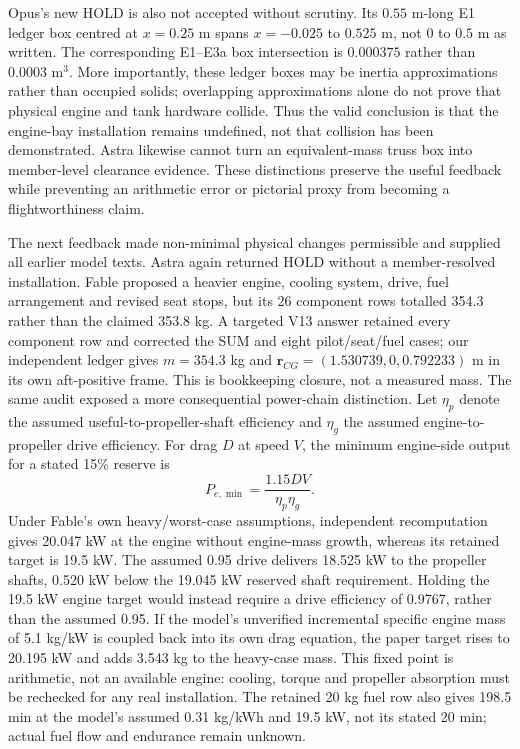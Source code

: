 \documentclass[10pt,letterpaper]{article}
\begin{document}
Opus's new HOLD is also not accepted without scrutiny. Its $0.55$ m-long E1 ledger box centred at $x=0.25$ m spans $x=-0.025$ to $0.525$ m, not $0$ to $0.5$ m as written. The corresponding E1--E3a box intersection is $0.000375$ rather than $0.0003$ m$^3$. More importantly, these ledger boxes may be inertia approximations rather than occupied solids; overlapping approximations alone do not prove that physical engine and tank hardware collide. Thus the valid conclusion is that the engine-bay installation remains undefined, not that collision has been demonstrated. Astra likewise cannot turn an equivalent-mass truss box into member-level clearance evidence. These distinctions preserve the useful feedback while preventing an arithmetic error or pictorial proxy from becoming a flightworthiness claim.

The next feedback made non-minimal physical changes permissible and supplied all earlier model texts. Astra again returned HOLD without a member-resolved installation. Fable proposed a heavier engine, cooling system, drive, fuel arrangement and revised seat stops, but its 26 component rows totalled 354.3 rather than the claimed 353.8 kg. A targeted V13 answer retained every component row and corrected the SUM and eight pilot/seat/fuel cases; our independent ledger gives $m=354.3$ kg and $\boldsymbol r_{CG}=(1.530739,0,0.792233)$ m in its own aft-positive frame. This is bookkeeping closure, not a measured mass. The same audit exposed a more consequential power-chain distinction. Let $\eta_p$ denote the assumed useful-to-propeller-shaft efficiency and $\eta_g$ the assumed engine-to-propeller drive efficiency. For drag $D$ at speed $V$, the minimum engine-side output for a stated 15\% reserve is
\begin{equation}\label{eq:drivegate}
P_{e,\min}=\frac{1.15DV}{\eta_p\eta_g}.
\end{equation}
Under Fable's own heavy/worst-case assumptions, independent recomputation gives 20.047 kW at the engine without engine-mass growth, whereas its retained target is 19.5 kW. The assumed 0.95 drive delivers 18.525 kW to the propeller shafts, 0.520 kW below the 19.045 kW reserved shaft requirement. Holding the 19.5 kW engine target would instead require a drive efficiency of 0.9767, rather than the assumed 0.95. If the model's unverified incremental specific engine mass of 5.1 kg/kW is coupled back into its own drag equation, the paper target rises to 20.195 kW and adds 3.543 kg to the heavy-case mass. This fixed point is arithmetic, not an available engine: cooling, torque and propeller absorption must be rechecked for any real installation. The retained 20 kg fuel row also gives 198.5 min at the model's assumed 0.31 kg/kWh and 19.5 kW, not its stated 20 min; actual fuel flow and endurance remain unknown.
\end{document}
